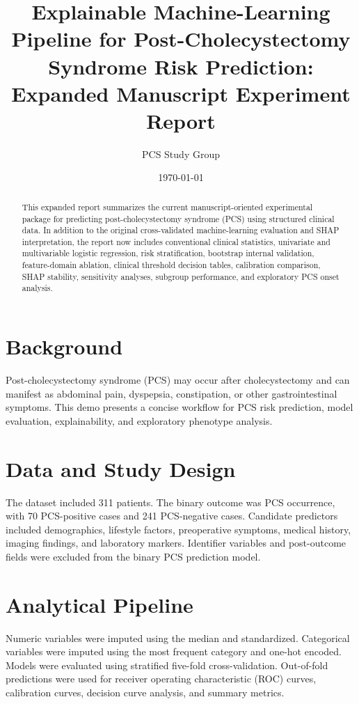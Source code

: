 \documentclass[11pt]{article}
\title{\textbf{Explainable Machine-Learning Pipeline for Post-Cholecystectomy Syndrome Risk Prediction: Expanded Manuscript Experiment Report}}
\author{PCS Study Group}
\date{\today}
\begin{document}
\maketitle

\begin{abstract}
This expanded report summarizes the current manuscript-oriented experimental package for predicting post-cholecystectomy syndrome (PCS) using structured clinical data. In addition to the original cross-validated machine-learning evaluation and SHAP interpretation, the report now includes conventional clinical statistics, univariate and multivariable logistic regression, risk stratification, bootstrap internal validation, feature-domain ablation, clinical threshold decision tables, calibration comparison, SHAP stability, sensitivity analyses, subgroup performance, and exploratory PCS onset analysis.
\end{abstract}

\section{Background}

Post-cholecystectomy syndrome (PCS) may occur after cholecystectomy and can manifest as abdominal pain, dyspepsia, constipation, or other gastrointestinal symptoms. This demo presents a concise workflow for PCS risk prediction, model evaluation, explainability, and exploratory phenotype analysis.

\section{Data and Study Design}

The dataset included 311 patients. The binary outcome was PCS occurrence, with 70 PCS-positive cases and 241 PCS-negative cases. Candidate predictors included demographics, lifestyle factors, preoperative symptoms, medical history, imaging findings, and laboratory markers. Identifier variables and post-outcome fields were excluded from the binary PCS prediction model.

\section{Analytical Pipeline}

Numeric variables were imputed using the median and standardized. Categorical variables were imputed using the most frequent category and one-hot encoded. Models were evaluated using stratified five-fold cross-validation. Out-of-fold predictions were used for receiver operating characteristic (ROC) curves, calibration curves, decision curve analysis, and summary metrics.
\end{document}
